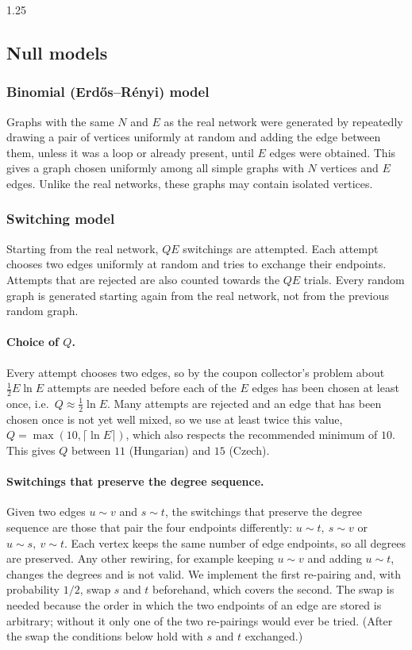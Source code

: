 \documentclass[12pt]{article}
\begin{document}
\begin{spacing}{1.25}
\subsection{Null models}

\subsubsection{Binomial (Erdős–Rényi) model}
Graphs with the same $N$ and $E$ as the real network were generated by repeatedly drawing a pair of vertices uniformly at random and adding the edge between them, unless it was a loop or already present, until $E$ edges were obtained. This gives a graph chosen uniformly among all simple graphs with $N$ vertices and $E$ edges. Unlike the real networks, these graphs may contain isolated vertices.

\subsubsection{Switching model}
Starting from the real network, $QE$ switchings are attempted. Each attempt chooses two edges uniformly at random and tries to exchange their endpoints. Attempts that are rejected are also counted towards the $QE$ trials. Every random graph is generated starting again from the real network, not from the previous random graph.

\paragraph{Choice of $Q$.}
Every attempt chooses two edges, so by the coupon collector's problem about $\tfrac{1}{2}E\ln E$ attempts are needed before each of the $E$ edges has been chosen at least once, i.e.\ $Q \approx \tfrac{1}{2}\ln E$. Many attempts are rejected and an edge that has been chosen once is not yet well mixed, so we use at least twice this value, $Q = \max(10,\lceil \ln E\rceil)$, which also respects the recommended minimum of $10$. This gives $Q$ between $11$ (Hungarian) and $15$ (Czech).

\paragraph{Switchings that preserve the degree sequence.}
Given two edges $u \sim v$ and $s \sim t$, the switchings that preserve the degree sequence are those that pair the four endpoints differently: $u \sim t,\ s \sim v$ or $u \sim s,\ v \sim t$. Each vertex keeps the same number of edge endpoints, so all degrees are preserved. Any other rewiring, for example keeping $u \sim v$ and adding $u \sim t$, changes the degrees and is not valid. We implement the first re-pairing and, with probability $1/2$, swap $s$ and $t$ beforehand, which covers the second. The swap is needed because the order in which the two endpoints of an edge are stored is arbitrary; without it only one of the two re-pairings would ever be tried. (After the swap the conditions below hold with $s$ and $t$ exchanged.)


\end{spacing}
\end{document}
